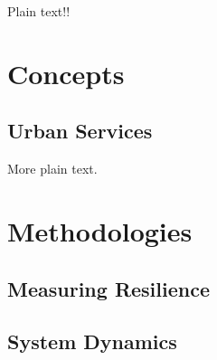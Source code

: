 \documentclass[twocolumn, 10pt, a4paper]{article}
\begin{document}
Plain text!!


	


\section{Concepts}

\subsection{Urban Services}

More plain text. 

\section{Methodologies}


\subsection{Measuring Resilience}

\subsection{System Dynamics}



\end{document}
